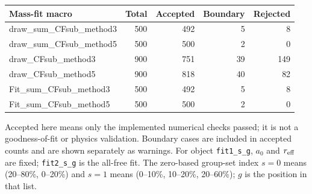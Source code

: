 \documentclass[11pt,a4paper]{article}
\begin{document}
{\small\begin{longtable}{lrrrr}\hline Mass-fit macro & Total & Accepted & Boundary & Rejected\\\hline\endhead
draw\_sum\_CFsub\_method3 & 500 & 492 & 5 & 8\\
draw\_sum\_CFsub\_method5 & 500 & 500 & 2 & 0\\
draw\_CFsub\_method3 & 900 & 751 & 39 & 149\\
draw\_CFsub\_method5 & 900 & 818 & 40 & 82\\
Fit\_sum\_CFsub\_method3 & 500 & 492 & 5 & 8\\
Fit\_sum\_CFsub\_method5 & 500 & 500 & 2 & 0\\
\hline\end{longtable}}
Accepted here means only the implemented numerical checks passed; it is not a goodness-of-fit or physics validation. Boundary cases are included in accepted counts and are shown separately as warnings.
For object \texttt{fit1\_s\_g}, $a_0$ and $r_{\rm eff}$ are fixed; \texttt{fit2\_s\_g} is the all-free fit. The zero-based group-set index $s=0$ means (20--80\%, 0--20\%) and $s=1$ means (0--10\%, 10--20\%, 20--60\%); $g$ is the position in that list.
\end{document}

